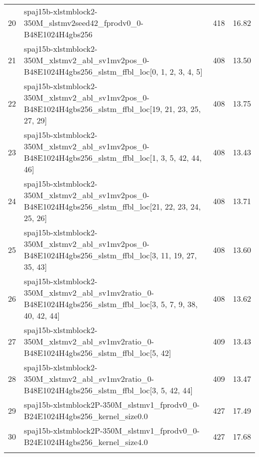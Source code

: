 \begin{tabular}{llrr}
20 & spaj15b-xlstmblock2-350M_slstmv2seed42_fprodv0_0-B48E1024H4gbs256 & 418 & 16.82 \\
21 & spaj15b-xlstmblock2-350M_xlstmv2_abl_sv1mv2pos_0-B48E1024H4gbs256_slstm_ffbl_loc[0, 1, 2, 3, 4, 5] & 408 & 13.50 \\
22 & spaj15b-xlstmblock2-350M_xlstmv2_abl_sv1mv2pos_0-B48E1024H4gbs256_slstm_ffbl_loc[19, 21, 23, 25, 27, 29] & 408 & 13.75 \\
23 & spaj15b-xlstmblock2-350M_xlstmv2_abl_sv1mv2pos_0-B48E1024H4gbs256_slstm_ffbl_loc[1, 3, 5, 42, 44, 46] & 408 & 13.43 \\
24 & spaj15b-xlstmblock2-350M_xlstmv2_abl_sv1mv2pos_0-B48E1024H4gbs256_slstm_ffbl_loc[21, 22, 23, 24, 25, 26] & 408 & 13.71 \\
25 & spaj15b-xlstmblock2-350M_xlstmv2_abl_sv1mv2pos_0-B48E1024H4gbs256_slstm_ffbl_loc[3, 11, 19, 27, 35, 43] & 408 & 13.60 \\
26 & spaj15b-xlstmblock2-350M_xlstmv2_abl_sv1mv2ratio_0-B48E1024H4gbs256_slstm_ffbl_loc[3, 5, 7, 9, 38, 40, 42, 44] & 408 & 13.62 \\
27 & spaj15b-xlstmblock2-350M_xlstmv2_abl_sv1mv2ratio_0-B48E1024H4gbs256_slstm_ffbl_loc[5, 42] & 409 & 13.43 \\
28 & spaj15b-xlstmblock2-350M_xlstmv2_abl_sv1mv2ratio_0-B48E1024H4gbs256_slstm_ffbl_loc[3, 5, 42, 44] & 409 & 13.47 \\
29 & spaj15b-xlstmblock2P-350M_slstmv1_fprodv0_0-B24E1024H4gbs256_kernel_size0.0 & 427 & 17.49 \\
30 & spaj15b-xlstmblock2P-350M_slstmv1_fprodv0_0-B24E1024H4gbs256_kernel_size4.0 & 427 & 17.68 \\
\bottomrule
\caption{xLSTM Model Ablations Val PPL}
\end{tabular}
